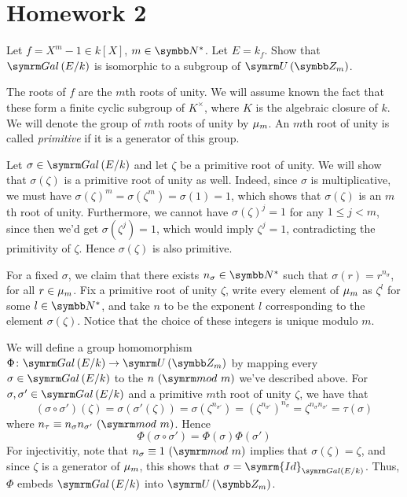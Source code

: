 \section*{Homework 2}

\setcounter{exercise}{0}

\begin{exercise}
Let \(f = X^m - 1 \in k[X]\), \(m \in \naturals^*\). Let \(E = k_f\). Show that \(\Gal{E}{k}\) is isomorphic to a subgroup of \(\units{\integersmod{m}}\).
\end{exercise}
\begin{solution}
The roots of \(f\) are the \(m\)th roots of unity. We will assume known the fact that these form a finite cyclic subgroup of \(K^{\times}\), where \(K\) is the algebraic closure of \(k\). We will denote the group of \(m\)th roots of unity by \(\mu_{m}\). An \(m\)th root of unity is called \emph{primitive} if it is a generator of this group.

Let \(\sigma \in \Gal{E}{k}\) and let \(\zeta\) be a primitive root of unity. We will show that \(\sigma(\zeta)\) is a primitive root of unity as well. Indeed, since \(\sigma\) is multiplicative, we must have \(\sigma(\zeta)^m = \sigma\left(\zeta^m\right) = \sigma(1) = 1\), which shows that \(\sigma(\zeta)\) is an \(m\)th root of unity. Furthermore, we cannot have \(\sigma(\zeta)^j = 1\) for any \(1 \leq j < m\), since then we'd get \(\sigma\left(\zeta^j\right) = 1\), which would imply \(\zeta^j = 1\), contradicting the primitivity of \(\zeta\). Hence \(\sigma(\zeta)\) is also primitive.

For a fixed \(\sigma\), we claim that there exists \(n_{\sigma} \in \naturals^*\) such that \(\sigma(r) = r^{n_{\sigma}}\), for all \(r \in \mu_{m}\). Fix a primitive root of unity \(\zeta\), write every element of \(\mu_{m}\) as \(\zeta^l\) for some \(l \in \naturals^*\), and take \(n\) to be the exponent \(l\) corresponding to the element \(\sigma(\zeta)\). Notice that the choice of these integers is unique modulo \(m\).

We will define a group homomorphism \(\Phi \colon \Gal{E}{k} \to \units{\integersmod{m}}\) by mapping every \(\sigma \in \Gal{E}{k}\) to the \(n \Mod{m}\) we've described above. For \(\sigma, \sigma' \in \Gal{E}{k}\) and a primitive \(m\)th root of unity \(\zeta\), we have that
\[
    (\sigma \circ \sigma') (\zeta) = \sigma (\sigma' (\zeta)) = \sigma \left(\zeta^{n_{\sigma'}}\right) = \left(\zeta^{n_{\sigma'}}\right)^{n_{\sigma}} = \zeta^{n_{\sigma} n_{\sigma'}} = \tau(\sigma)
\]
where \(n_{\tau} \equiv n_{\sigma} n_{\sigma'} \Mod{m}\). Hence
\[
    \Phi(\sigma \circ \sigma') = \Phi(\sigma) \Phi(\sigma')
\]
For injectivitiy, note that \(n_{\sigma} \equiv 1 \Mod{m}\) implies that \(\sigma(\zeta) = \zeta\), and since \(\zeta\) is a generator of \(\mu_{m}\), this shows that \(\sigma = \symrm{Id}_{\Gal{E}{k}}\). Thus, \(\Phi\) embeds \(\Gal{E}{k}\) into \(\units{\integersmod{m}}\).
\end{solution}

